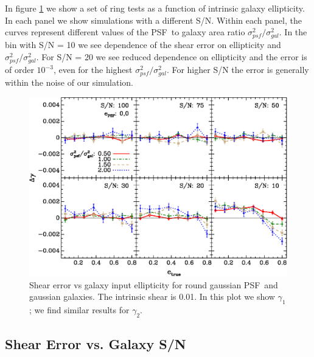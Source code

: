 \documentclass[10pt,preprint]{aastex}
\newcommand{\aratio}{\ensuremath{\sigma^2_{psf}/\sigma^2_{gal}}}
\newcommand{\psf}{PSF}
\newcommand{\Rshear}{\ensuremath{\mathcal{R}}}
\newcommand{\rfracerr}{\ensuremath{\Delta \Rshear/\Rshear}}
\begin{document}
In figure \ref{fig:set-e-gg01} we show a set of ring tests as a function of
intrinsic galaxy ellipticity.  In each panel we show simulations with a
different S/N.  Within each panel, the curves represent different values of the
\psf\ to galaxy area ratio \aratio.  In the bin with S/N = 10 we see dependence
of the shear error on ellipticity and \aratio.  For S/N = 20 we see reduced
dependence on ellipticity and the error is of order $10^{-3}$, even for the
highest \aratio.  For higher S/N the error is generally within the noise of our
simulation.

\begin{figure}[t] \centering
 \centering 
 \includegraphics[scale=1]{figures/set-e-gg01-yr-0.005-0.005-vs-e.eps}

 \caption{Shear error vs galaxy input ellipticity for round gaussian \psf\ and
 gaussian galaxies. The intrinsic shear is 0.01.  In this plot we show
 $\gamma_1$; we find similar results for $\gamma_2$.  \label{fig:set-e-gg01}}

\end{figure}



\subsection{Shear Error vs. Galaxy S/N}
\end{document}
